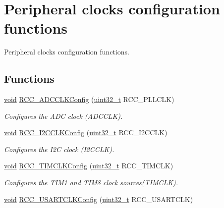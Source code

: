 \hypertarget{group___r_c_c___group3}{\section{Peripheral clocks configuration functions}
\label{group___r_c_c___group3}
}


Peripheral clocks configuration functions.  


\subsection*{Functions}
\begin{DoxyCompactItemize}
\item 
\hyperlink{group___n_a_m_e_ga18028b8badbf1ea7e704ccac3c488e82}{void} \hyperlink{group___r_c_c___group3_gad90a1c680d25567cfbd2221f735283d7}{R\-C\-C\-\_\-\-A\-D\-C\-C\-L\-K\-Config} (\hyperlink{stdint_8h_a435d1572bf3f880d55459d9805097f62}{uint32\-\_\-t} R\-C\-C\-\_\-\-P\-L\-L\-C\-L\-K)
\begin{DoxyCompactList}\small\item\em Configures the A\-D\-C clock (A\-D\-C\-C\-L\-K). \end{DoxyCompactList}\item 
\hyperlink{group___n_a_m_e_ga18028b8badbf1ea7e704ccac3c488e82}{void} \hyperlink{group___r_c_c___group3_ga66b58739422650e402e3221fa5510c54}{R\-C\-C\-\_\-\-I2\-C\-C\-L\-K\-Config} (\hyperlink{stdint_8h_a435d1572bf3f880d55459d9805097f62}{uint32\-\_\-t} R\-C\-C\-\_\-\-I2\-C\-C\-L\-K)
\begin{DoxyCompactList}\small\item\em Configures the I2\-C clock (I2\-C\-C\-L\-K). \end{DoxyCompactList}\item 
\hyperlink{group___n_a_m_e_ga18028b8badbf1ea7e704ccac3c488e82}{void} \hyperlink{group___r_c_c___group3_gaa0763c5e329e66734b062fcc13d35d72}{R\-C\-C\-\_\-\-T\-I\-M\-C\-L\-K\-Config} (\hyperlink{stdint_8h_a435d1572bf3f880d55459d9805097f62}{uint32\-\_\-t} R\-C\-C\-\_\-\-T\-I\-M\-C\-L\-K)
\begin{DoxyCompactList}\small\item\em Configures the T\-I\-M1 and T\-I\-M8 clock sources(\-T\-I\-M\-C\-L\-K). \end{DoxyCompactList}\item 
\hyperlink{group___n_a_m_e_ga18028b8badbf1ea7e704ccac3c488e82}{void} \hyperlink{group___r_c_c___group3_ga0d2c34ecdf16a77b6975ad69525aa7cc}{R\-C\-C\-\_\-\-U\-S\-A\-R\-T\-C\-L\-K\-Config} (\hyperlink{stdint_8h_a435d1572bf3f880d55459d9805097f62}{uint32\-\_\-t} R\-C\-C\-\_\-\-U\-S\-A\-R\-T\-C\-L\-K)

\end{DoxyCompactItemize}
